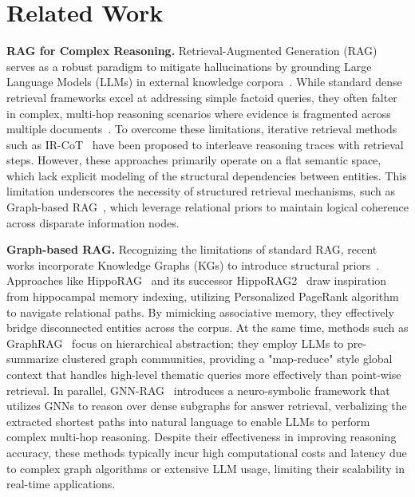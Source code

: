 \section{Related Work}

\textbf{RAG for Complex Reasoning.}
Retrieval-Augmented Generation (RAG) serves as a robust paradigm to mitigate hallucinations by grounding Large Language Models (LLMs) in external knowledge corpora~\cite{lewis2020retrieval}. While standard dense retrieval frameworks excel at addressing simple factoid queries, they often falter in complex, multi-hop reasoning scenarios where evidence is fragmented across multiple documents~\cite{yang2018hotpotqa, thakur2021beir}. To overcome these limitations, iterative retrieval methods such as IR-CoT~\cite{trivedi2023interleaving} have been proposed to interleave reasoning traces with retrieval steps. However, these approaches primarily operate on a flat semantic space, which lack explicit modeling of the structural dependencies between entities. This limitation underscores the necessity of structured retrieval mechanisms, such as Graph-based RAG~\cite{edge2024local}, which leverage relational priors to maintain logical coherence across disparate information nodes.

\textbf{Graph-based RAG.}
Recognizing the limitations of standard RAG, recent works incorporate Knowledge Graphs (KGs) to introduce structural priors~\cite{hu2025graggraphretrievalaugmentedgeneration, mavromatis2024gnnraggraphneuralretrieval}.
Approaches like HippoRAG~\cite{jimenez2024hipporag} and its successor HippoRAG2~\cite{gutierrez2025rag} draw inspiration from hippocampal memory indexing, utilizing Personalized PageRank algorithm to navigate relational paths. By mimicking associative memory, they effectively bridge disconnected entities across the corpus. At the same time, methods such as GraphRAG~\cite{edge2024local} focus on hierarchical abstraction; they employ LLMs to pre-summarize clustered graph communities, providing a "map-reduce" style global context that handles high-level thematic queries more effectively than point-wise retrieval.
In parallel, GNN-RAG~\cite{mavromatis2024gnnraggraphneuralretrieval} introduces a neuro-symbolic framework that utilizes GNNs to reason over dense subgraphs for answer retrieval, verbalizing the extracted shortest paths into natural language to enable LLMs to perform complex multi-hop reasoning.
Despite their effectiveness in improving reasoning accuracy, these methods typically incur high computational costs and latency due to complex graph algorithms or extensive LLM usage, limiting their scalability in real-time applications.

